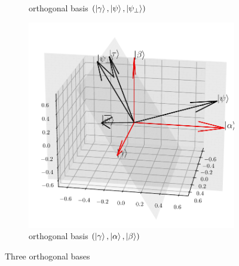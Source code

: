 \documentclass[a4paper,10pt]{book}
\numberwithin{equation}{section}
\begin{document}
\begin{figure}[h]
\begin{subfigure}[b]{0.33\columnwidth}
        \caption{orthogonal basis $(\ket{\gamma},\ket{\psi},\ket{\psi_{\perp}})$}
    \end{subfigure}
    \begin{subfigure}[b]{0.33\columnwidth}
        \includegraphics[width=\columnwidth]{figures/basic_1.pdf}
        \caption{orthogonal basis $(\ket{\gamma},\ket{\alpha},\ket{\beta})$}
    \end{subfigure}
    \caption{Three orthogonal bases}
    \label{fig:basics}
\end{figure}
\end{document}
